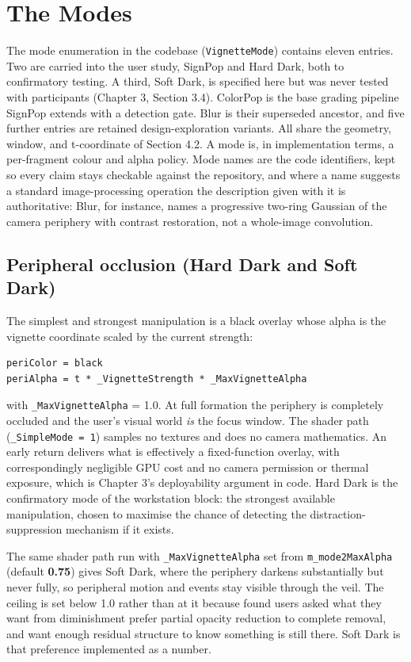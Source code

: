 \section{The Modes}

The mode enumeration in the codebase (\verb|VignetteMode|) contains eleven entries. Two are carried
into the user study, SignPop and Hard Dark, both to confirmatory testing. A third, Soft Dark, is
specified here but was never tested with participants (Chapter 3, Section 3.4). ColorPop is the base
grading pipeline SignPop extends with a detection gate. Blur is their superseded ancestor, and five
further entries are retained design-exploration variants. All share the geometry, window, and
t-coordinate of Section 4.2. A mode is, in implementation terms, a per-fragment colour and alpha
policy. Mode names are the code identifiers, kept so every claim stays checkable against the
repository, and where a name suggests a standard image-processing operation the description given
with it is authoritative: Blur, for instance, names a progressive two-ring Gaussian of the camera
periphery with contrast restoration, not a whole-image convolution.

\subsection{Peripheral occlusion (Hard Dark and Soft Dark)}

The simplest and strongest manipulation is a black overlay whose alpha is the vignette coordinate
scaled by the current strength:

\begin{verbatim}
periColor = black
periAlpha = t * _VignetteStrength * _MaxVignetteAlpha
\end{verbatim}

\noindent with \verb|_MaxVignetteAlpha| = 1.0. At full formation the periphery is completely
occluded and the user's visual world \textit{is} the focus window. The shader path (\verb|_SimpleMode = 1|) samples no textures and does no camera mathematics.
An early return delivers what is effectively a fixed-function overlay, with correspondingly
negligible GPU cost and no camera permission or thermal exposure, which is Chapter 3's deployability
argument in code. Hard Dark is the confirmatory mode of the workstation block: the strongest
available manipulation, chosen to maximise the chance of detecting the distraction-suppression
mechanism if it exists.

The same shader path run with \verb|_MaxVignetteAlpha| set from \verb|m_mode2MaxAlpha| (default
\textbf{0.75}) gives Soft Dark, where the periphery darkens substantially but never fully, so
peripheral motion and events stay visible through the veil. The ceiling is set below 1.0 rather than
at it because \citet{cheng2022} found users asked what they want from diminishment prefer partial
opacity reduction to complete removal, and want enough residual structure to know something is still
there. Soft Dark is that preference implemented as a number.

